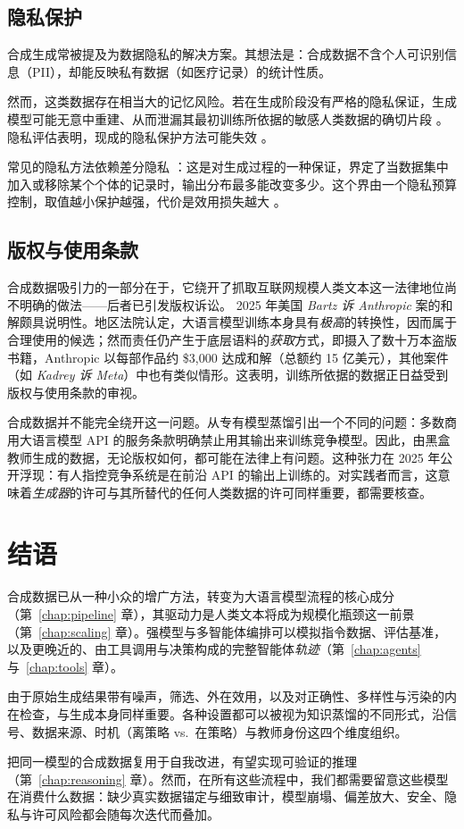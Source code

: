 \subsection{隐私保护}
合成生成常被提及为数据隐私的解决方案。其想法是：合成数据不含个人可识别信息（PII）\citep{dwork2014algorithmic}，却能反映私有数据（如医疗记录）的统计性质。

然而，这类数据存在相当大的记忆风险。若在生成阶段没有严格的隐私保证，生成模型可能无意中重建、从而泄漏其最初训练所依据的敏感人类数据的确切片段 \citep{274574}。
隐私评估表明，现成的隐私保护方法可能失效 \citep{ramesh-etal-2024-evaluating}。

常见的隐私方法依赖差分隐私 \citep{dwork2006calibrating}：这是对生成过程的一种保证，界定了当数据集中加入或移除某个个体的记录时，输出分布最多能改变多少。这个界由一个隐私预算控制，取值越小保护越强，代价是效用损失越大 \citep{yue-etal-2023-synthetic}。


\subsection{版权与使用条款}
合成数据吸引力的一部分在于，它绕开了抓取互联网规模人类文本这一法律地位尚不明确的做法——后者已引发版权诉讼。%
2025 年美国 \emph{Bartz 诉 Anthropic} 案的和解颇具说明性。地区法院认定，大语言模型训练本身具有{\em 极高}的转换性，因而属于合理使用的候选；然而责任仍产生于底层语料的\emph{获取}方式，即摄入了数十万本盗版书籍，Anthropic 以每部作品约 \$3{,}000 达成和解（总额约 15 亿美元），其他案件（如 \emph{Kadrey 诉 Meta}）中也有类似情形。这表明，训练所依据的数据正日益受到版权与使用条款的审视。

合成数据并不能完全绕开这一问题。从专有模型蒸馏引出一个不同的问题：多数商用大语言模型 API 的服务条款明确禁止用其输出来训练竞争模型。因此，由黑盒教师生成的数据，无论版权如何，都可能在法律上有问题。这种张力在 2025 年公开浮现：有人指控竞争系统是在前沿 API 的输出上训练的。对实践者而言，这意味着\emph{生成器}的许可与其所替代的任何人类数据的许可同样重要，都需要核查。


\section{结语}
合成数据已从一种小众的增广方法，转变为大语言模型流程的核心成分（第~\ref{chap:pipeline} 章），其驱动力是人类文本将成为规模化瓶颈这一前景（第~\ref{chap:scaling} 章）。强模型与多智能体编排可以模拟指令数据、评估基准，以及更晚近的、由工具调用与决策构成的完整智能体\emph{轨迹}（第~\ref{chap:agents} 与~\ref{chap:tools} 章）。

由于原始生成结果带有噪声，筛选、外在效用，以及对正确性、多样性与污染的内在检查，与生成本身同样重要。各种设置都可以被视为知识蒸馏的不同形式，沿信号、数据来源、时机（离策略 vs.\ 在策略）与教师身份这四个维度组织。

把同一模型的合成数据复用于自我改进，有望实现可验证的推理（第~\ref{chap:reasoning} 章）。然而，在所有这些流程中，我们都需要留意这些模型在消费什么数据：缺少真实数据锚定与细致审计，模型崩塌、偏差放大、安全、隐私与许可风险都会随每次迭代而叠加。



